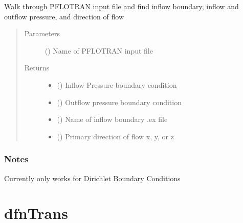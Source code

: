 \documentclass[letterpaper,10pt,english]{sphinxmanual}
\begin{document}
\begin{fulllineitems}
\label{\detokenize{pydfnworks:pydfnworks.dfnFlow.mass_balance.parse_pflotran_input}}
Walk through PFLOTRAN input file and find inflow boundary, inflow and outflow pressure, and direction of flow
\begin{quote}\begin{description}
\item[{Parameters}] \leavevmode
{} () \textendash{} Name of PFLOTRAN input file

\item[{Returns}] \leavevmode
\begin{itemize}
\item {} 
 () \textendash{} Inflow Pressure boundary condition

\item {} 
 () \textendash{} Outflow pressure boundary condition

\item {} 
 () \textendash{} Name of inflow boundary .ex file

\item {} 
 () \textendash{} Primary direction of flow x, y, or z

\end{itemize}


\end{description}\end{quote}
\subsubsection*{Notes}

Currently only works for Dirichlet Boundary Conditions

\end{fulllineitems}



\section{dfnTrans}
\label{\detokenize{pydfnworks:dfntrans}}
\end{document}
